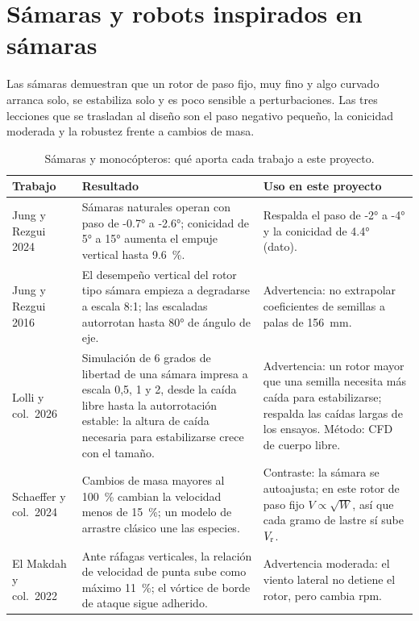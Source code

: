 \section{Sámaras y robots inspirados en sámaras}\label{sec:literatura-samaras}
Las sámaras demuestran que un rotor de paso fijo, muy fino y algo curvado arranca solo,
se estabiliza solo y es poco sensible a perturbaciones. Las tres lecciones que se
trasladan al diseño son el paso negativo pequeño, la conicidad moderada y la robustez
frente a cambios de masa.

\begin{table}[H]
\centering\footnotesize
\caption{Sámaras y monocópteros: qué aporta cada trabajo a este proyecto.}
\label{tab:literatura-samaras}
\begin{tabularx}{\textwidth}{@{}>{\raggedright\arraybackslash}p{3.1cm} >{\raggedright\arraybackslash}Y >{\raggedright\arraybackslash}Y@{}}
\toprule
\textbf{Trabajo} & \textbf{Resultado} & \textbf{Uso en este proyecto}\\\midrule
Jung y Rezgui 2024~\cite{literatura-jung2024} & Sámaras naturales operan con paso de \ang{-0.7} a \ang{-2.6}; conicidad de \ang{5} a \ang{15} aumenta el empuje vertical hasta \SI{9.6}{\percent}. & Respalda el paso de \ang{-2} a \ang{-4} y la conicidad de \ang{4.4} (dato).\\
Jung y Rezgui 2016~\cite{literatura-jung2016} & El desempeño vertical del rotor tipo sámara empieza a degradarse a escala 8:1; las escaladas autorrotan hasta \ang{80} de ángulo de eje. & Advertencia: no extrapolar coeficientes de semillas a palas de \SI{156}{mm}.\\
Lolli y col.\ 2026~\cite{literatura-lolli2026} & Simulación de 6 grados de libertad de una sámara impresa a escala 0,5, 1 y 2, desde la caída libre hasta la autorrotación estable: la altura de caída necesaria para estabilizarse crece con el tamaño. & Advertencia: un rotor mayor que una semilla necesita más caída para estabilizarse; respalda las caídas largas de los ensayos. Método: CFD de cuerpo libre.\\
Schaeffer y col.\ 2024~\cite{literatura-schaeffer2024} & Cambios de masa mayores al \SI{100}{\percent} cambian la velocidad menos de \SI{15}{\percent}; un modelo de arrastre clásico une las especies. & Contraste: la sámara se autoajusta; en este rotor de paso fijo $V\propto\sqrt{W}$, así que cada gramo de lastre sí sube $V_{\mathrm{r}}$.\\
El Makdah y col.\ 2022~\cite{literatura-elmakdah2022} & Ante ráfagas verticales, la relación de velocidad de punta sube como máximo \SI{11}{\percent}; el vórtice de borde de ataque sigue adherido. & Advertencia moderada: el viento lateral no detiene el rotor, pero cambia rpm.\\

\end{tabularx}
\end{table}
